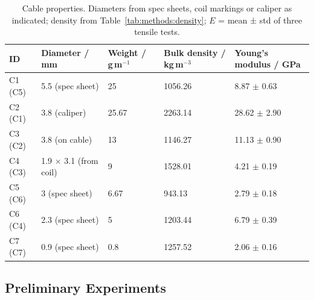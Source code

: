 \begin{table}[H]
  \centering
  \begin{tabularx}{\textwidth}{l l l l X}
    \toprule
    \textbf{ID} & \textbf{Diameter / mm} & \textbf{Weight / g\,m$^{-1}$} &
    \textbf{Bulk density / kg\,m$^{-3}$} & \textbf{Young's modulus / GPa} \\
    \midrule
    C1 (C5) & 5.5 (spec sheet) & 25 & 1056.26 & 8.87 $\pm$ 0.63 \\
    C2 (C1) & 3.8 (caliper) & 25.67 & 2263.14 & 28.62 $\pm$ 2.90 \\
    C3 (C2) & 3.8 (on cable) & 13 & 1146.27 & 11.13 $\pm$ 0.90 \\
    C4 (C3) & 1.9 $\times$ 3.1 (from coil) & 9 & 1528.01 & 4.21 $\pm$ 0.19 \\
    C5 (C6) & 3 (spec sheet) & 6.67 & 943.13 & 2.79 $\pm$ 0.18 \\
    C6 (C4) & 2.3 (spec sheet) & 5 & 1203.44 & 6.79 $\pm$ 0.39 \\
    C7 (C7) & 0.9 (spec sheet) & 0.8 & 1257.52 & 2.06 $\pm$ 0.16 \\
    \bottomrule
  \end{tabularx}
  \caption[Cable properties]{Cable properties. Diameters from spec sheets,
    coil markings or caliper as indicated; density from
    Table~\ref{tab:methods:density}; $E$ = mean ± std of three tensile
    tests.}
  \label{tab:methods:cableparams}
\end{table}


\subsection{Preliminary Experiments}
\label{sec:methods:preliminary}

